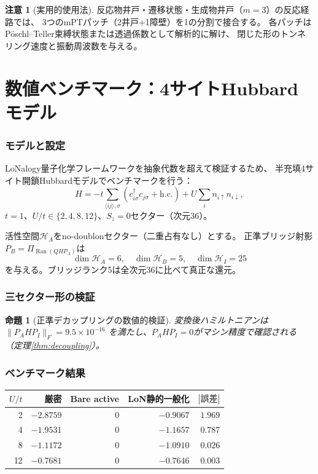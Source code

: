 \documentclass[12pt]{article}
\theoremstyle{plain}
\newtheorem{proposition}[theorem]{命題}
\theoremstyle{definition}
\newtheorem{remark}[theorem]{注意}
\numberwithin{equation}{section}
\DeclareMathOperator{\Ran}{Ran}
\begin{document}
\begin{remark}[実用的使用法]
反応物井戸・遷移状態・生成物井戸（$m=3$）の反応経路では、
3つのmPTパッチ（2井戸+1障壁）を1の分割で接合する。
各パッチはP\"oschl--Teller束縛状態または透過係数として解析的に解け、
閉じた形のトンネリング速度と振動周波数を与える。
\end{remark}


\part{数値ベンチマーク：4サイトHubbardモデル}

\section{モデルと設定}\label{sec:hubbard}

LoNalogy量子化学フレームワークを抽象代数を超えて検証するため、
半充填4サイト開鎖Hubbardモデルでベンチマークを行う：
\begin{equation}
H = -t\sum_{\langle ij\rangle,\sigma}
(c_{i\sigma}^\dagger c_{j\sigma}+\mathrm{h.c.})
+ U\sum_i n_{i\uparrow}n_{i\downarrow},
\end{equation}
$t=1$、$U/t\in\{2,4,8,12\}$、$S_z=0$セクター（次元36）。

活性空間$\mathcal{H}_A$をno-doublonセクター（二重占有なし）とする。
正準ブリッジ射影$P_B=\Pi_{\Ran(QHP_A)}$は
\begin{equation}
\dim\mathcal{H}_A=6,\quad
\dim\mathcal{H}_B=5,\quad
\dim\mathcal{H}_I=25
\end{equation}
を与える。ブリッジランク5は全次元36に比べて真正な還元。

\section{三セクター形の検証}\label{sec:verify}

\begin{proposition}[正準デカップリングの数値的検証]\label{prop:numerical}
変換後ハミルトニアンは
$\|P_AHP_I\|_F = 9.5\times 10^{-16}$
を満たし、$P_AHP_I=0$がマシン精度で確認される
（定理\ref{thm:decoupling}）。
\end{proposition}

\section{ベンチマーク結果}\label{sec:results}

\begin{center}
\begin{tabular}{rrrrr}
\toprule
$U/t$ & 厳密 & Bare active & LoN静的一般化 & $|\text{誤差}|$\\
\midrule
2 & $-2.8759$ & $0$ & $-0.9067$ & $1.969$\\
4 & $-1.9531$ & $0$ & $-1.1657$ & $0.787$\\
8 & $-1.1172$ & $0$ & $-1.0910$ & $0.026$\\
12 & $-0.7681$ & $0$ & $-0.7646$ & $0.003$\\
\bottomrule
\end{tabular}
\end{center}
\end{document}

